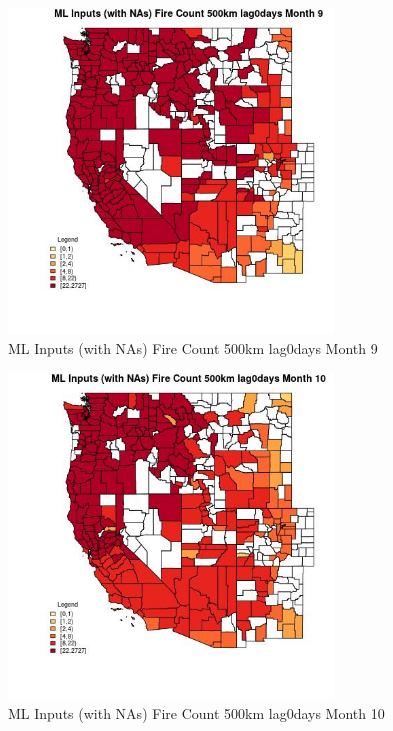 \begin{figure} 
\centering  
\includegraphics[width=0.77\textwidth]{Code_Outputs/Report_ML_input_PM25_Step4_part_f_de_duplicated_aves_prioritize_24hr_obswNAs_CountyFire_Count_500km_lag0daysmedianMonth9.jpg} 
\caption{\label{fig:Report_ML_input_PM25_Step4_part_f_de_duplicated_aves_prioritize_24hr_obswNAsCountyFire_Count_500km_lag0daysmedianMonth9}ML Inputs (with NAs) Fire Count 500km lag0days Month 9} 
\end{figure} 
 

\begin{figure} 
\centering  
\includegraphics[width=0.77\textwidth]{Code_Outputs/Report_ML_input_PM25_Step4_part_f_de_duplicated_aves_prioritize_24hr_obswNAs_CountyFire_Count_500km_lag0daysmedianMonth10.jpg} 
\caption{\label{fig:Report_ML_input_PM25_Step4_part_f_de_duplicated_aves_prioritize_24hr_obswNAsCountyFire_Count_500km_lag0daysmedianMonth10}ML Inputs (with NAs) Fire Count 500km lag0days Month 10} 
\end{figure} 
 

